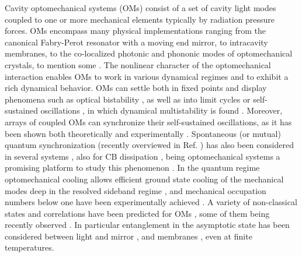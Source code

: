\documentclass[a4paper]{jpconf}
\begin{document}
Cavity optomechanical systems (OMs) consist of a set of cavity light modes 
coupled to one or more mechanical elements typically by radiation pressure forces. 
OMs encompass many physical implementations ranging from the canonical 
Fabry-Perot resonator with a moving end mirror, to intracavity membranes, to the co-localized photonic and 
phononic modes of optomechanical crystals, to mention some \cite{1}. The nonlinear character of 
the optomechanical interaction enables OMs to work in various dynamical regimes 
and to exhibit a rich dynamical behavior. OMs can settle both in fixed points 
and display phenomena such as optical bistability \cite{2,3}, as well as 
into limit cycles or self-sustained oscillations \cite{4,5}, in which 
dynamical multistability is found \cite{6,7,8}. Moreover, arrays of 
coupled OMs can synchronize their self-sustained oscillations, as it has been 
shown both theoretically \cite{9,10,11} and 
experimentally \cite{12,13,14}. Spontaneous (or mutual) quantum synchronization (recently overviewed in Ref. \cite{55}) has also been considered in several systems 
\cite{55,30,31,lalo,extrasync1,extrasync2,extrasync4,extrasync5,extrasync6,crctn2,crctn3,crctn4}, also for CB dissipation \cite{30,31,lalo,extrasync2,extrasync4,extrasync5,extrasync6},
being optomechanical systems a promising platform to study this phenomenon
\cite{extrasync1,extrasync2,extrasync4,crctn2,crctn3,crctn4}. In the quantum regime optomechanical cooling allows efficient ground 
state cooling of the mechanical modes deep in the resolved sideband 
regime \cite{15,16}, and mechanical occupation numbers below one have been 
experimentally achieved \cite{17,18}. A variety of non-classical states and 
correlations have been predicted for OMs \cite{1}, some of them being recently 
observed \cite{19,20,21}. In particular entanglement in the asymptotic state has been considered 
between light and mirror \cite{22,23}, and  membranes \cite{24,25}, 
even at finite temperatures.  
\end{document}
